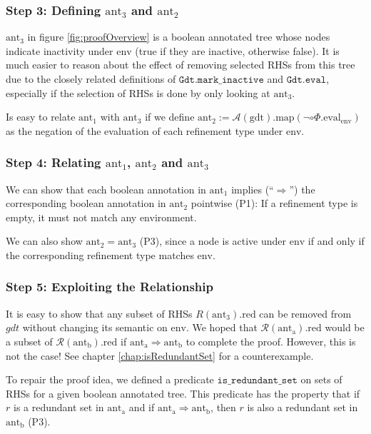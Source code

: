 \subsubsection{Step 3: Defining $\mathrm{ant}_3$ and $\mathrm{ant}_2$}

$\mathrm{ant}_3$ in figure \ref{fig:proofOverview} is a boolean annotated tree whose nodes indicate inactivity under $\mathrm{env}$ (true if they are inactive, otherwise false).
It is much easier to reason about the effect of removing selected RHSs from this tree due to the closely related definitions of $\mathtt{Gdt.mark\_inactive}$ and $\mathtt{Gdt.eval}$, especially if the selection of RHSs is done by only looking at $\mathrm{ant}_3$.

Is easy to relate $\mathrm{ant_1}$ with $\mathrm{ant_3}$ if we define $\mathrm{ant_2} := \mathcal{A}(\mathrm{gdt}).\mathrm{map}(\neg \circ \Phi.\mathrm{eval}_{\mathrm{env}})$ as the negation of the evaluation of each refinement type under $\mathrm{env}$.

\subsubsection{Step 4: Relating $\mathrm{ant}_1$, $\mathrm{ant}_2$ and $\mathrm{ant}_3$}

We can show that each boolean annotation in $\mathrm{ant_1}$ implies (``$\Rightarrow$'') the corresponding boolean annotation in $\mathrm{ant_2}$ pointwise (P1):
If a refinement type is empty, it must not match any environment.

We can also show $\mathrm{ant}_2 = \mathrm{ant}_3$ (P3), since a node is active under $\mathrm{env}$ if and only if the corresponding refinement type matches $\mathrm{env}$.

\subsubsection{Step 5: Exploiting the Relationship}

It is easy to show that any subset of RHSs $R(\mathrm{ant_3}).\mathrm{red}$ can be removed from $gdt$ without changing its semantic on $\mathrm{env}$.
We hoped that $\mathcal{R}(\mathrm{ant_a}).\mathrm{red}$ would be a subset of $\mathcal{R}(\mathrm{ant_b}).\mathrm{red}$ if $\mathrm{ant_a} \Rightarrow \mathrm{ant_b}$ to complete the proof. However, this is not the case! See chapter \ref{chap:isRedundantSet} for a counterexample.

To repair the proof idea, we defined a predicate $\mathtt{is\_redundant\_set}$ on sets of RHSs for a given boolean annotated tree.
This predicate has the property that if $r$ is a redundant set in $\mathrm{ant_a}$ and if $\mathrm{ant_a} \Rightarrow \mathrm{ant_b}$,
then $r$ is also a redundant set in $\mathrm{ant_b}$ (P3).

